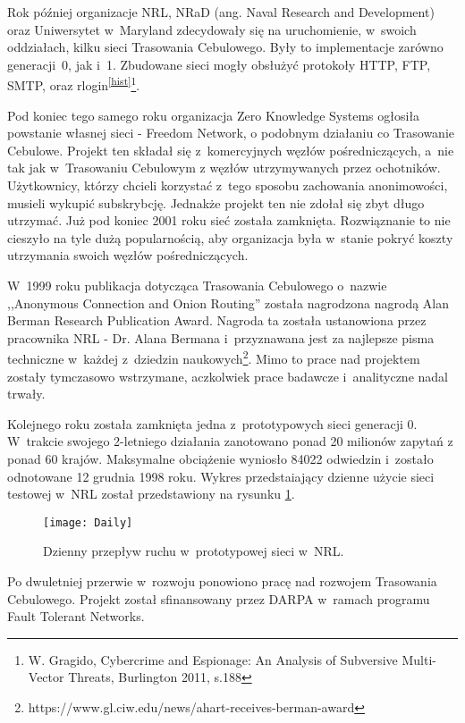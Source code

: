 Rok później organizacje NRL,  NRaD (ang. Naval Research and Development) oraz Uniwersytet w~Maryland zdecydowały się na uruchomienie, w~swoich oddziałach, kilku sieci Trasowania Cebulowego. Były to implementacje zarówno generacji~0, jak i~1. Zbudowane sieci mogły obsłużyć protokoły HTTP, FTP, SMTP, oraz rlogin\textsuperscript{\ref{hist}}\footnote{W. Gragido, Cybercrime and Espionage: An Analysis of Subversive Multi-Vector Threats, Burlington 2011, s.188}. 

Pod koniec tego samego roku organizacja Zero Knowledge Systems ogłosiła powstanie własnej sieci - Freedom Network, o podobnym działaniu co Trasowanie Cebulowe. Projekt ten składał się z~komercyjnych węzłów pośredniczących, a~nie tak jak w~Trasowaniu Cebulowym z węzłów utrzymywanych przez ochotników. Użytkownicy, którzy chcieli korzystać z~tego sposobu zachowania anonimowości, musieli wykupić subskrybcję. Jednakże projekt ten nie zdołał się zbyt długo utrzymać. Już pod koniec 2001 roku sieć została zamknięta. Rozwiąznanie to nie cieszyło na tyle dużą popularnością, aby organizacja była w~stanie pokryć koszty utrzymania swoich węzłów pośredniczących.

W~1999 roku publikacja dotycząca Trasowania Cebulowego o~nazwie ,,Anonymous Connection and Onion Routing'' została nagrodzona nagrodą Alan Berman Research Publication Award. Nagroda ta została ustanowiona przez pracownika NRL - Dr. Alana Bermana i~przyznawana jest za najlepsze pisma techniczne w~każdej z~dziedzin naukowych\footnote{https://www.gl.ciw.edu/news/ahart-receives-berman-award}. Mimo to prace nad projektem zostały tymczasowo wstrzymane, aczkolwiek prace badawcze i~analityczne nadal trwały.

Kolejnego roku została zamknięta jedna z~prototypowych sieci generacji 0. W~trakcie swojego 2-letniego działania zanotowano ponad 20 milionów zapytań z ponad 60 krajów. Maksymalne obciążenie wyniosło 84022 odwiedzin i~zostało odnotowane 12 grudnia 1998 roku. Wykres przedstaiający dzienne użycie sieci testowej w~NRL został przedstawiony na rysunku \ref{rys:dzienny}.

\begin{figure}
  \centering
  \texttt{[image: Daily]} 
  \caption[Caption for LOF]{Dzienny przepływ ruchu w~prototypowej sieci w~NRL\footnotemark.}
  \label{rys:dzienny}
\end{figure}

Po dwuletniej przerwie w~rozwoju ponowiono pracę nad rozwojem Trasowania Cebulowego. Projekt został sfinansowany przez DARPA w~ramach programu Fault Tolerant Networks.


